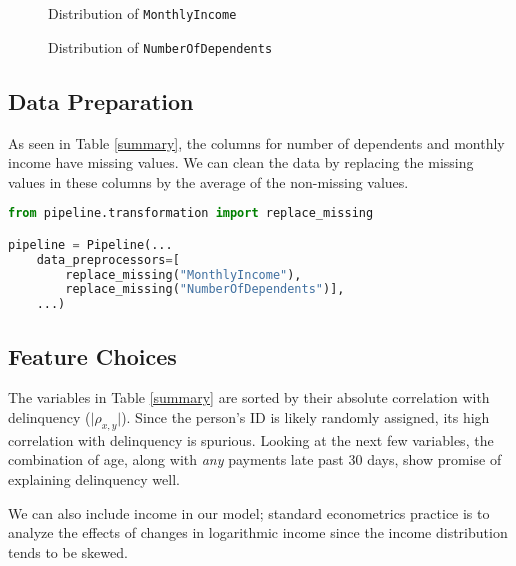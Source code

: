 \documentclass[11pt]{article}
\begin{document}
\begin{minipage}[t]{0.45\textwidth}
\vspace{0pt}
\begin{figure}[H]

\caption{Distribution of \texttt{MonthlyIncome}}
\end{figure}
\end{minipage}\hfill
\begin{minipage}[t]{0.45\textwidth}
\vspace{0pt}
\begin{figure}[H]

\vspace{16pt}
\caption{Distribution of \texttt{NumberOfDependents}}
\end{figure}
\end{minipage}

\subsection{Data Preparation}
As seen in Table \ref{summary}, the columns for number of dependents and monthly income have missing values. We can clean the data by replacing the missing values in these columns by the average of the non-missing values.

\begin{lstlisting}[language=Python,numbers=none]
from pipeline.transformation import replace_missing

pipeline = Pipeline(...
    data_preprocessors=[
        replace_missing("MonthlyIncome"), 
        replace_missing("NumberOfDependents")],
    ...)
\end{lstlisting}
\pagebreak
\subsection{Feature Choices}
The variables in Table \ref{summary} are sorted by their absolute correlation with delinquency ($\vert\rho_{x,y}\vert$). Since the person's ID is likely randomly assigned, its high correlation with delinquency is spurious. Looking at the next few variables, the combination of age, along with \textit{any} payments late past 30 days, show promise of explaining delinquency well. 

We can also include income in our model; standard econometrics practice is to analyze the effects of changes in logarithmic income since the income distribution tends to be skewed.
\end{document}
